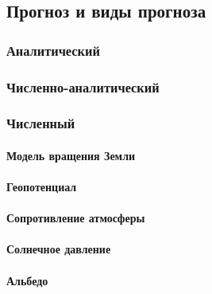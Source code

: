 \subsection{Прогноз и виды прогноза}

\subsubsection{Аналитический}

\subsubsection{Численно-аналитический}

\subsubsection{Численный}

\paragraph{Модель вращения Земли}

\paragraph{Геопотенциал}

\paragraph{Сопротивление атмосферы}

\paragraph{Солнечное давление}

\paragraph{Альбедо}